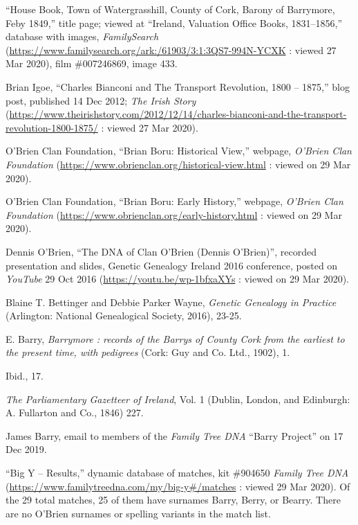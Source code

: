 \begin{thebibliography}{99}
	``House Book, Town of Watergrasshill, County of Cork, Barony of Barrymore, Feby 1849,'' title page; viewed at ``Ireland, Valuation Office Books, 1831--1856,'' database with images, \textit{FamilySearch} (\url{https://www.familysearch.org/ark:/61903/3:1:3QS7-994N-YCXK} : viewed 27 Mar 2020), film \#007246869, image 433.
	
	Brian Igoe, ``Charles Bianconi and The Transport Revolution, 1800 -- 1875,'' blog post, published 14 Dec 2012; \textit{The Irish Story} (\url{https://www.theirishstory.com/2012/12/14/charles-bianconi-and-the-transport-revolution-1800-1875/} : viewed 27 Mar 2020).
	
	O'Brien Clan Foundation, ``Brian Boru: Historical View,'' webpage, \textit{O'Brien Clan Foundation} (\url{https://www.obrienclan.org/historical-view.html} : viewed on 29 Mar 2020).
	
	O'Brien Clan Foundation, ``Brian Boru: Early History,'' webpage, \textit{O'Brien Clan Foundation} (\url{https://www.obrienclan.org/early-history.html} : viewed on 29 Mar 2020).	
	
	Dennis O'Brien, ``The DNA of Clan O'Brien (Dennis O'Brien)'', recorded presentation and slides, Genetic Genealogy Ireland 2016 conference, posted on \textit{YouTube} 29 Oct 2016 (\url{https://youtu.be/wp-1bfxaXYs} : viewed on 29 Mar 2020).
	
	Blaine T. Bettinger and Debbie Parker Wayne, \textit{Genetic Genealogy in Practice} (Arlington: National Genealogical Society, 2016), 23-25.
	
	E. Barry, \textit{Barrymore : records of the Barrys of County Cork from the earliest to the present time, with pedigrees} (Cork: Guy and Co. Ltd., 1902), 1.
	
	Ibid., 17.
	
	\textit{The Parliamentary Gazetteer of Ireland}, Vol. 1 (Dublin, London, and Edinburgh: A. Fullarton and Co., 1846) 227.
	
	James Barry, email to members of the \textit{Family Tree DNA} ``Barry Project'' on 17 Dec 2019.
	
	``Big Y -- Results,'' dynamic database of matches, kit \#904650 \textit{Family Tree DNA} (\url{https://www.familytreedna.com/my/big-y#/matches} : viewed 29 Mar 2020). Of the 29 total matches, 25 of them have surnames Barry, Berry, or Bearry. There are no O'Brien surnames or spelling variants in the match list.
	

\end{thebibliography}
